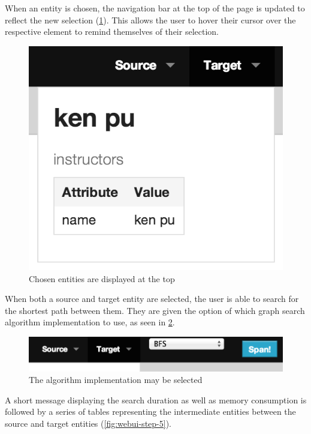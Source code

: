 	When an entity is chosen, the navigation bar at the top of the page is updated to reflect the new selection (\cref{fig:webui-step-3}).  This allows the user to hover their cursor over the respective element to remind themselves of their selection.
	
	\begin{figure}[H]
		\centering
		\includegraphics[scale=0.5]{figures/images/step-3}
		
		\caption{Chosen entities are displayed at the top}
		\label{fig:webui-step-3}
	\end{figure}
	
	When both a source and target entity are selected, the user is able to search for the shortest path between them.  They are given the option of which graph search algorithm implementation to use, as seen in \cref{fig:webui-step-4}.
	
	\begin{figure}[H]
		\centering
		\includegraphics[scale=0.5]{figures/images/step-4}
		
		\caption{The algorithm implementation may be selected}
		\label{fig:webui-step-4}
	\end{figure}
	
	A short message displaying the search duration as well as memory consumption is followed by a series of tables representing the intermediate entities between the source and target entities (\cref{fig:webui-step-5}).
	
